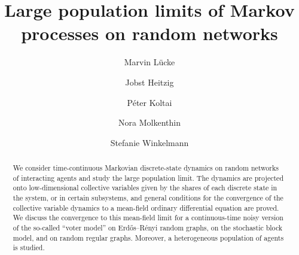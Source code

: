 \documentclass[a4paper,
               10pt,
               pdftex,
               normalheadings,
               headsepline,
               footsepline,
               headinclude,
               footinclude,
               DIV=14,
               abstracton]
{scrartcl}
\begin{document}
\title{Large population limits of Markov processes on random networks}
\author[1]{Marvin Lücke}
\author[3]{Jobst Heitzig}
\author[2]{Péter Koltai}
\author[4]{Nora Molkenthin}
\author[1]{Stefanie Winkelmann}


\date{}

\maketitle
\begin{abstract}
We consider time-continuous Markovian discrete-state dynamics on random networks of interacting agents and study the large population limit. The dynamics are projected onto low-dimensional collective variables given by the shares of each discrete state in the system, or in certain subsystems, and general conditions for the convergence of the collective variable dynamics to a mean-field ordinary differential equation are proved. We discuss the convergence to this mean-field limit for a continuous-time noisy version of the so-called ``voter model'' on Erd\H{o}s--Rényi random graphs, on the stochastic block model, and on random regular graphs. Moreover, a heterogeneous population of agents is studied.
\end{abstract}
\end{document}
